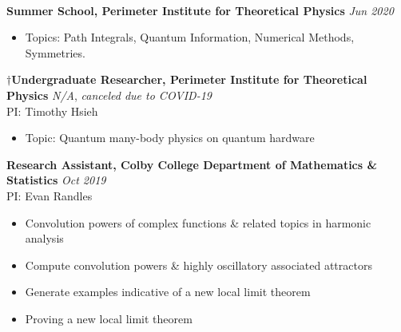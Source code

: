 \documentclass[letter, 11pt]{article}
\newcommand{\longunderline}[1]{\uline{#1\hfill\mbox{}}}
\begin{document}
	\vspace{-7pt}
	\noindent \longunderline{\normalsize{{}}}
	\\ \vspace{-7pt}
	
	\noindent \textbf{Summer School, Perimeter Institute for Theoretical Physics} \hfill \textit{Jun 2020}
	\begin{itemize}[noitemsep, nolistsep]
		\item Topics: Path Integrals, Quantum Information, Numerical Methods, Symmetries.
	\end{itemize}
	
	\noindent $\dagger$\textbf{Undergraduate Researcher, Perimeter Institute for Theoretical Physics} \hfill \textit{N/A},
	\textit{canceled due to COVID-19}\\
	\noindent PI: Timothy Hsieh
	\begin{itemize}[noitemsep, nolistsep]
		\item Topic: Quantum many-body physics on quantum hardware
	\end{itemize}
	
	\noindent \textbf{Research Assistant, Colby College Department of Mathematics \& Statistics} \hfill \textit{Oct 2019\textemdash} \\ 
	\noindent PI: {Evan Randles}
	\begin{itemize}[noitemsep, nolistsep]
		\item Convolution powers of complex functions \& related topics in harmonic analysis
		\item Compute convolution powers \& highly oscillatory associated attractors
		\item Generate examples indicative of a new local limit theorem
		\item Proving a new local limit theorem
	\end{itemize}
	
\end{document}
